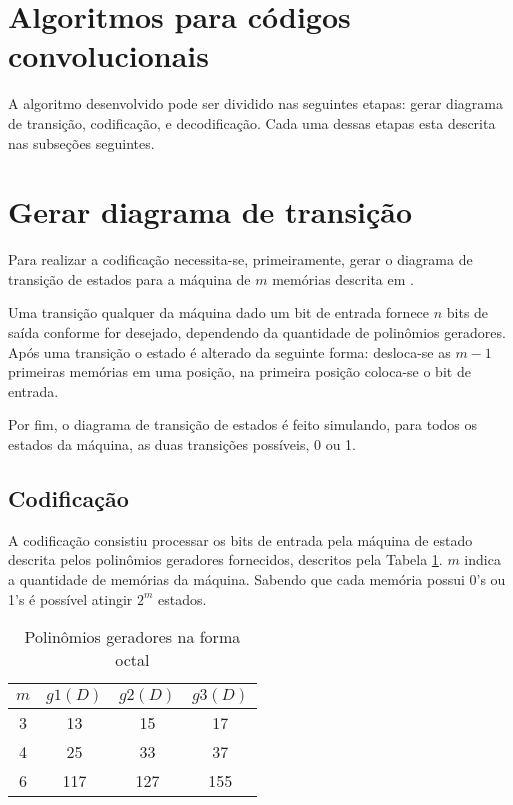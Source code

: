 \section{Algoritmos para códigos convolucionais}
A algoritmo desenvolvido pode ser dividido nas seguintes etapas: gerar diagrama de transição, codificação, e decodificação. Cada uma dessas etapas esta descrita nas subseções seguintes.

\section{Gerar diagrama de transição}

Para realizar a codificação necessita-se, primeiramente, gerar o diagrama de transição de estados para a máquina de $m$ memórias descrita em \cite{ref:roteiro_lab3}. 

Uma transição qualquer da máquina dado um bit de entrada fornece $n$ bits de saída conforme for desejado, dependendo da quantidade de polinômios geradores.
Após uma transição o estado é alterado da seguinte forma: desloca-se as $m-1$ primeiras memórias em uma posição, na primeira posição coloca-se o bit de entrada.

Por fim, o diagrama de transição de estados é feito simulando, para todos os estados da máquina, as duas transições possíveis, 0 ou 1.


\subsection{Codificação}

A codificação consistiu processar os bits de entrada pela máquina de estado descrita pelos polinômios geradores fornecidos, descritos pela Tabela \ref{tab:polinomios_geradores}. $m$ indica a quantidade de memórias da máquina. Sabendo que cada memória possui 0's ou 1's é possível atingir $2^{m}$ estados.

\begin{table}[h!]
	\centering
	\caption{Polinômios geradores na forma octal}
	\label{tab:polinomios_geradores}
	\begin{tabular}{|c|c|c|c|}
		\hline
		$m$ & $g1(D)$ & $g2(D)$ & $g3(D)$ \\ \hline\hline
		 3  &   13    &   15    &   17    \\ \hline
		 4  &   25    &   33    &   37    \\ \hline
		 6  &   117   &   127   &   155   \\ \hline
	\end{tabular} 
\end{table}

